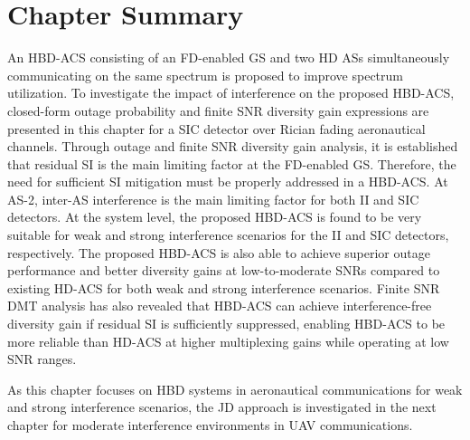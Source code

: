 
\section{Chapter Summary}
An HBD-ACS consisting of an FD-enabled GS and two HD ASs simultaneously communicating on the same spectrum is proposed to improve spectrum utilization. To investigate the impact of interference on the proposed HBD-ACS, closed-form outage probability and finite SNR diversity gain expressions are presented in this chapter for a SIC detector over Rician fading aeronautical channels. Through outage and finite SNR diversity gain analysis, it is established that residual SI is the main limiting factor at the FD-enabled GS. Therefore, the need for sufficient SI mitigation must be properly addressed in a HBD-ACS. At AS-2, inter-AS interference is the main limiting factor for both II and SIC detectors. At the system level, the proposed HBD-ACS is found to be very suitable for weak and strong interference scenarios for the II and SIC detectors, respectively. The proposed HBD-ACS is also able to achieve superior outage performance and better diversity gains at low-to-moderate SNRs compared to existing HD-ACS for both weak and strong interference scenarios. Finite SNR DMT analysis has also revealed that HBD-ACS can achieve interference-free diversity gain if residual SI is sufficiently suppressed, enabling HBD-ACS to be more reliable than HD-ACS at higher multiplexing gains while operating at low SNR ranges.

As this chapter focuses on HBD systems in aeronautical communications for weak and strong interference scenarios, the JD approach is investigated in the next chapter for moderate interference environments in UAV communications.



